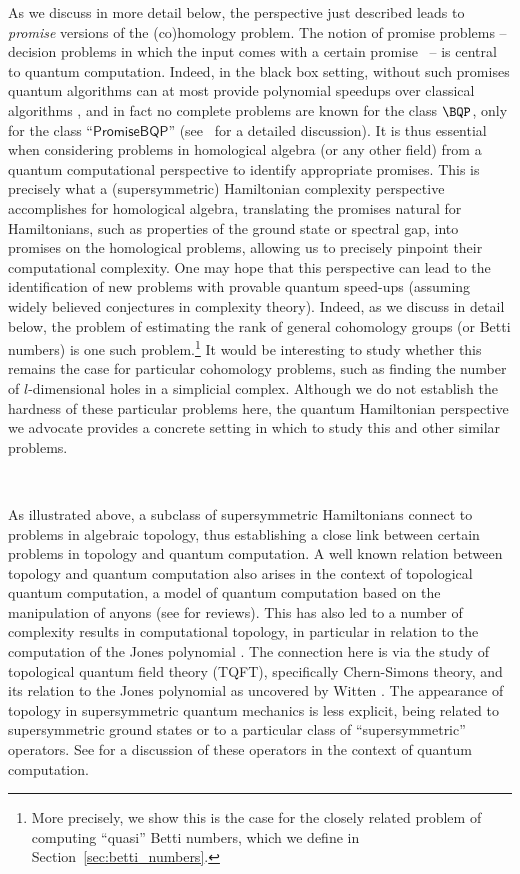 \documentclass[11pt]{article}
\numberwithin{equation}{section}
\renewcommand\( {\left(}
\renewcommand\) {\right)}
\begin{document}
As we discuss in more detail below, the perspective just described leads to {\it promise} versions of the (co)homology problem. The notion of promise problems -- decision problems in which the input comes with a certain promise~\cite{goldreich2006promise} -- is central to quantum computation. Indeed, in the black box setting, without such promises quantum algorithms can at most provide polynomial speedups over classical algorithms \cite{beals2001quantum}, and in fact no complete problems are known for the class $\BQP$, only for the class ``$\mathsf{PromiseBQP}$'' (see~\cite{janzing2007simple} for a detailed discussion). It is thus essential when considering problems in  homological algebra (or any other field) from a quantum computational perspective to identify appropriate promises. This is precisely what a (supersymmetric) Hamiltonian complexity perspective accomplishes for homological algebra, translating the promises natural for Hamiltonians, such as properties of the ground state or spectral gap, into promises on the homological problems, allowing us to precisely pinpoint their computational complexity. One may hope that this perspective can lead to the identification of new problems with  provable quantum speed-ups (assuming widely believed conjectures in complexity theory). Indeed, as we discuss in detail below, the problem of estimating the rank of general cohomology groups (or Betti numbers) is one such problem.\footnote{More precisely, we show this is the case for the closely related problem of computing ``quasi'' Betti numbers, which we define in Section~\ref{sec:betti_numbers}.} It would be interesting to study whether this remains the case for particular cohomology problems, such as finding the number of $l$-dimensional holes in a simplicial complex. Although we do not establish the hardness of these particular problems here, the quantum Hamiltonian perspective we advocate provides a concrete setting in which to study this and other similar problems. 


\

As illustrated above,  a  subclass of supersymmetric Hamiltonians connect to problems in algebraic topology, thus establishing a close link between certain problems in  topology and quantum computation. A well known relation between topology and quantum computation also arises in the context of topological quantum computation, a model of quantum computation based on the manipulation of anyons \cite{Freedman1998PNPAT,2001quant.ph..1025F} (see \cite{preskillnotes,Lahtinen_2017} for reviews). This has also led to a number of complexity results in computational topology, in particular in relation to the computation of the Jones polynomial \cite{Kitaev_2003,Freedman_2002,2000quant.ph..1108F,aharonov2005polynomial}. The connection here is via the study of topological quantum field theory (TQFT), specifically Chern-Simons theory, and its  relation to the Jones polynomial as uncovered by Witten \cite{Witten:1988hf}. The appearance of topology in supersymmetric quantum mechanics is less explicit, being related to supersymmetric ground states or to a particular class of ``supersymmetric'' operators. See \cite{Crichigno:2020vue} for a discussion of these operators in the context of quantum computation.
\end{document}
